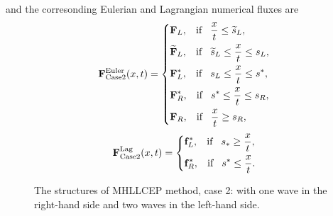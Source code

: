 \documentclass[review]{elsarticle}
\begin{document}
  and the corresonding Eulerian and Lagrangian numerical fluxes are
 \begin{equation}\label{eq:HLLCEP}
   \mathbf{F}^{\text{Euler}}_{\text{Case2}}(x,t) = \left\{ \begin{aligned}
       & \mathbf{F}_L, \hspace{0.3cm} \text{if} \hspace{0.3cm} \frac{x}{t}\le \widetilde{s}_L, \\
        &  \widetilde{\mathbf{F}}_L, \hspace{0.3cm} \text{if} \hspace{0.3cm} \widetilde{s}_L\le \frac{x}{t} \le   s_L , \\
        &\mathbf{F}_L^*, \hspace{0.3cm} \text{if} \hspace{0.3cm} s_L\le \frac{x}{t} \le s^*, \\
        & \mathbf{F}_R^*, \hspace{0.3cm} \text{if} \hspace{0.3cm} s^*\le \frac{x}{t} \le s_R,\\
        & \mathbf{F}_R, \hspace{0.3cm} \text{if} \hspace{0.3cm} \frac{x}{t}\ge s_R, \\
      \end{aligned}
    \right.
  \end{equation}
\begin{equation}
    \mathbf{F}^{\text{Lag}}_{\text{Case2}}(x,t) = \left\{ \begin{aligned}
        & \mathbf{f}_L^*, \hspace{0.3cm} \text{if} \hspace{0.3cm} s_*\ge \frac{x}{t},\\
        & \mathbf{f}_R^*, \hspace{0.3cm} \text{if} \hspace{0.3cm} s^*\le \frac{x}{t}.\\
      \end{aligned}
    \right.
  \end{equation}
%
\begin{figure}[ht]
   \centering
{}
\caption{The  structures of MHLLCEP method, case 2: with  one wave in the right-hand side and  two waves in the left-hand side.}
\label{fig:case2}
\end{figure}
\end{document}
